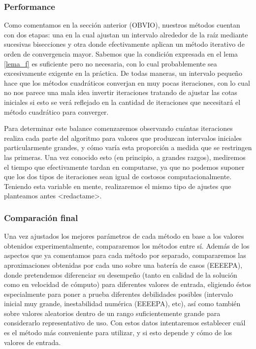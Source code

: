 	\subsubsection{Performance}
Como comentamos en la sección anterior (OBVIO), nuestros métodos cuentan con dos etapas: una en la cual ajustan un intervalo alrededor de la raíz mediante sucesivas bisecciones y otra donde efectivamente aplican un método iterativo de orden de convergencia mayor. Sabemos que la condición expresada en el lema \ref{lema_f} es suficiente pero no necesaria, con lo cual probablemente sea excesivamente exigente en la práctica. De todas maneras, un intervalo pequeño hace que los métodos cuadráticos converjan en muy pocas iteraciones, con lo cual no nos parece una mala idea invertir iteraciones tratando de ajustar las cotas iniciales si esto se verá reflejado en la cantidad de iteraciones que necesitará el método cuadrático para converger.

Para determinar este balance comenzaremos observando cuántas iteraciones realiza cada parte del algoritmo para valores que produzcan intervalos iniciales particularmente grandes, y cómo varía esta proporción a medida que se restringen las primeras. Una vez conocido esto (en principio, a grandes razgos), mediremos el tiempo que efectivamente tardan en computarse, ya que no podemos suponer que los dos tipos de iteraciones sean igual de costosos computacionalmente. Teniendo esta variable en mente, realizaremos el mismo tipo de ajustes que planteamos antes <redactame>.

	\subsubsection{Comparación final}
Una vez ajustados los mejores parámetros de cada método en base a los valores obtenidos experimentalmente, compararemos los métodos entre sí. Además de los aspectos que ya comentamos para cada método por separado, compararemos las aproximaciones obtenidas por cada uno sobre una batería de casos (EEEEPA), donde pretendemos diferenciar su desempeño (tanto en calidad de la solución como en velocidad de cómputo) para diferentes valores de entrada, eligiendo éstos especialmente para poner a prueba diferentes debilidades posibles (intervalo inicial muy grande, inestabilidad numérica (EEEEPA), etc), así como también sobre valores aleatorios dentro de un rango suficientemente grande para considerarlo representativo de uso. Con estos datos intentaremos establecer cuál es el método más conveniente para utilizar, y si esto depende y cómo de los valores de entrada.



